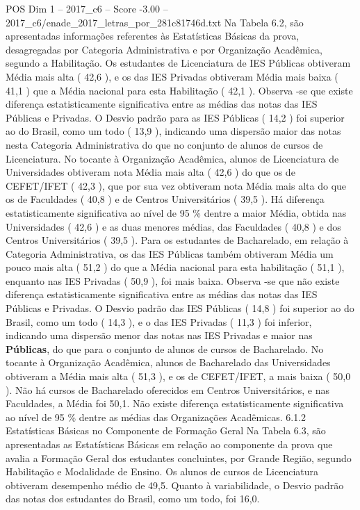 \begin{textsample}{POS Dim 1 – 2017\_c6 – Score -3.00 – 2017\_c6/enade\_2017\_letras\_por\_281c81746d.txt}
Na Tabela 6.2, são apresentadas informações referentes às Estatísticas Básicas da prova, desagregadas por Categoria Administrativa e por Organização Acadêmica, segundo a Habilitação.
Os estudantes de Licenciatura de IES Públicas obtiveram Média mais alta ( 42,6 ), e os das IES Privadas obtiveram Média mais baixa ( 41,1 ) que a Média nacional para esta Habilitação ( 42,1 ).
Observa -se que existe diferença estatisticamente significativa entre as médias das notas das IES Públicas e Privadas.
O Desvio padrão para as IES Públicas ( 14,2 ) foi superior ao do Brasil, como um todo ( 13,9 ), indicando uma dispersão maior das notas nesta Categoria Administrativa do que no conjunto de alunos de cursos de Licenciatura.
No tocante à Organização Acadêmica, alunos de Licenciatura de Universidades obtiveram nota Média mais alta ( 42,6 ) do que os de CEFET/IFET ( 42,3 ), que por sua vez obtiveram nota Média mais alta do que os de Faculdades ( 40,8 ) e de Centros Universitários ( 39,5 ).
Há diferença estatisticamente significativa ao nível de 95 \% dentre a maior Média, obtida nas Universidades ( 42,6 ) e as duas menores médias, das Faculdades ( 40,8 ) e dos Centros Universitários ( 39,5 ).
Para os estudantes de Bacharelado, em relação à Categoria Administrativa, os das IES Públicas também obtiveram Média um pouco mais alta ( 51,2 ) do que a Média nacional para esta habilitação ( 51,1 ), enquanto nas IES Privadas ( 50,9 ), foi mais baixa.
Observa -se que não existe diferença estatisticamente significativa entre as médias das notas das IES Públicas e Privadas.
O Desvio padrão das IES Públicas ( 14,8 ) foi superior ao do Brasil, como um todo ( 14,3 ), e o das IES Privadas ( 11,3 ) foi inferior, indicando uma dispersão menor das notas nas IES Privadas e maior nas \textbf{Públicas}, do que para o conjunto de alunos de cursos de Bacharelado.
No tocante à Organização Acadêmica, alunos de Bacharelado das Universidades obtiveram a Média mais alta ( 51,3 ), e os de CEFET/IFET, a mais baixa ( 50,0 ).
Não há cursos de Bacharelado oferecidos em Centros Universitários, e nas Faculdades, a Média foi 50,1.
Não existe diferença estatisticamente significativa ao nível de 95 \% dentre as médias das Organizações Acadêmicas. 6.1.2 Estatísticas Básicas no Componente de Formação Geral Na Tabela 6.3, são apresentadas as Estatísticas Básicas em relação ao componente da prova que avalia a Formação Geral dos estudantes concluintes, por Grande Região, segundo Habilitação e Modalidade de Ensino.
Os alunos de cursos de Licenciatura obtiveram desempenho médio de 49,5.
Quanto à variabilidade, o Desvio padrão das notas dos estudantes do Brasil, como um todo, foi 16,0.

\end{textsample}
